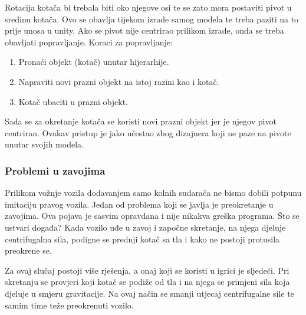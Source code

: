 Rotacija kotača bi trebala biti oko njegove osi te se zato mora postaviti pivot u sredinu kotača. Ovo se obavlja tijekom izrade samog modela te treba paziti na to prije unosa u unity. Ako se pivot nije centrirao prilikom izrade, onda se treba obavljati popravljanje. Koraci za popravljanje:

\begin{enumerate}
	\item Pronaći objekt (kotač) unutar hijerarhije.
	\item Napraviti novi prazni objekt na istoj razini kao i kotač.
	\item Kotač ubaciti u prazni objekt.
\end{enumerate}
Sada se za okretanje kotača se koristi novi prazni objekt jer je njegov pivot centriran. Ovakav pristup je jako učestao zbog dizajnera koji ne paze na pivote unutar svojih modela.

\subsubsection{Problemi u zavojima}
Prilikom vožnje vozila dodavanjem samo kolnih sudarača ne bismo dobili potpunu imitaciju pravog vozila. Jedan od problema koji se javlja je preokretanje u zavojima. Ova pojava je sasvim opravdana i nije nikakva greška programa. Što se ustvari događa? Kada vozilo uđe u zavoj i započne skretanje, na njega djeluje centrifugalna sila, podigne se prednji kotač sa tla i kako ne postoji protusila preokrene se.

Za ovaj slučaj postoji više rješenja, a onaj koji se koristi u igrici je sljedeći. Pri skretanju se provjeri koji kotač se podiže od tla i na njega se primjeni sila koja djeluje u smjeru gravitacije. Na ovaj način se smanji utjecaj centrifugalne sile te samim time teže preokrenuti vozilo.